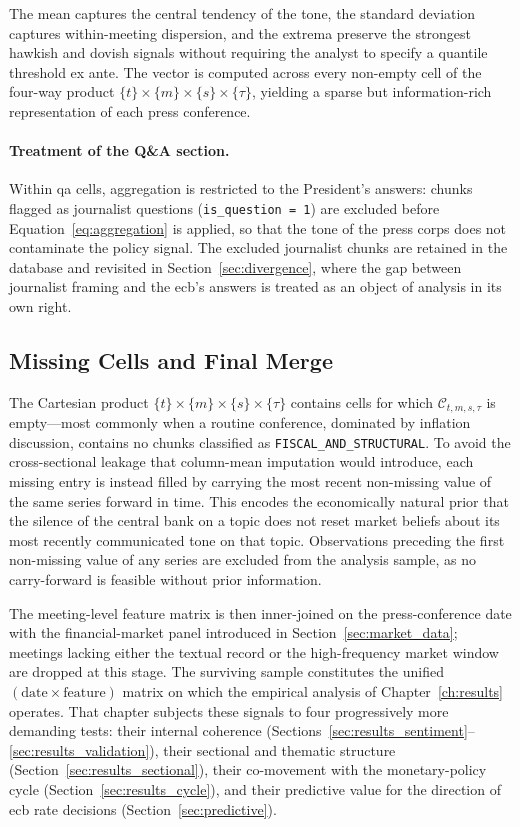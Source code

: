 The mean captures the central tendency of the tone, the standard deviation captures within-meeting dispersion, and the extrema preserve the strongest hawkish and dovish signals without requiring the analyst to specify a quantile threshold ex ante. The vector is computed across every non-empty cell of the four-way product $\{t\} \times \{m\} \times \{s\} \times \{\tau\}$, yielding a sparse but information-rich representation of each press conference.

\paragraph{Treatment of the Q\&A section.} Within \gls{qa} cells, aggregation is restricted to the President's answers: chunks flagged as journalist questions (\texttt{is\_question = 1}) are excluded before Equation~\ref{eq:aggregation} is applied, so that the tone of the press corps does not contaminate the policy signal. The excluded journalist chunks are retained in the database and revisited in Section~\ref{sec:divergence}, where the gap between journalist framing and the \gls{ecb}'s answers is treated as an object of analysis in its own right.

\subsection{Missing Cells and Final Merge}
\label{sec:final_merge}

The Cartesian product $\{t\} \times \{m\} \times \{s\} \times \{\tau\}$ contains cells for which $\mathcal{C}_{t,m,s,\tau}$ is empty---most commonly when a routine conference, dominated by inflation discussion, contains no chunks classified as \texttt{FISCAL\_AND\_STRUCTURAL}. To avoid the cross-sectional leakage that column-mean imputation would introduce, each missing entry is instead filled by carrying the most recent non-missing value of the same series forward in time. This encodes the economically natural prior that the silence of the central bank on a topic does not reset market beliefs about its most recently communicated tone on that topic. Observations preceding the first non-missing value of any series are excluded from the analysis sample, as no carry-forward is feasible without prior information.

The meeting-level feature matrix is then inner-joined on the press-conference date with the financial-market panel introduced in Section~\ref{sec:market_data}; meetings lacking either the textual record or the high-frequency market window are dropped at this stage. The surviving sample constitutes the unified $(\text{date} \times \text{feature})$ matrix on which the empirical analysis of Chapter~\ref{ch:results} operates. That chapter subjects these signals to four progressively more demanding tests: their internal coherence (Sections~\ref{sec:results_sentiment}--\ref{sec:results_validation}), their sectional and thematic structure (Section~\ref{sec:results_sectional}), their co-movement with the monetary-policy cycle (Section~\ref{sec:results_cycle}), and their predictive value for the direction of \gls{ecb} rate decisions (Section~\ref{sec:predictive}).